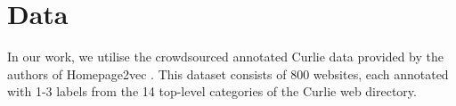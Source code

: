 

\section{Data}
In our work, we utilise the crowdsourced annotated Curlie data provided by the authors of Homepage2vec \cite{homepage2vec}. 
This dataset consists of 800 websites, each annotated with 1-3 labels from the 14 top-level categories of the Curlie web directory.